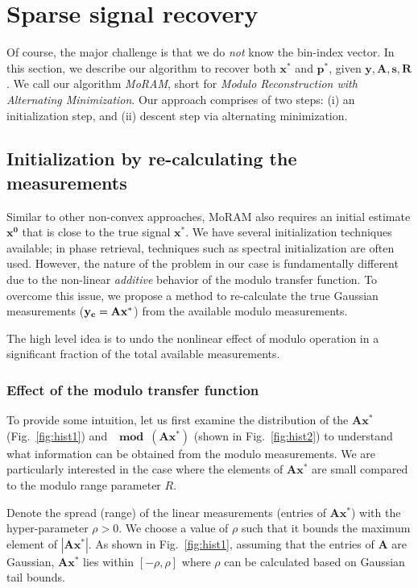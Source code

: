 \section{Sparse signal recovery}
\label{sec:algo}
Of course, the major challenge is that we do \emph{not} know the bin-index vector. In this section, we describe our algorithm to recover both $\mathbf{x^*}$ and $\mathbf{p^*}$, given $\mathbf{y, A, s, R}$.  We call our algorithm \emph{MoRAM}, short for \emph{Modulo Reconstruction with Alternating Minimization}. Our approach comprises of two steps: (i) an initialization step, and (ii) descent step via alternating minimization.

\subsection{Initialization by re-calculating the measurements}
\label{sec:init}

Similar to other non-convex approaches, MoRAM also requires an initial estimate $\mathbf{{x}^0}$ that is close to the true signal $\mathbf{{x}^*}$. We have several initialization techniques available; in phase retrieval, techniques such as spectral initialization are often used. However, the nature of the problem in our case is fundamentally different due to the non-linear \emph{additive} behavior of the modulo transfer function. To overcome this issue, we propose a method to re-calculate the true Gaussian measurements ($\mathbf{y_c}= \mathbf{Ax^*}$) from the available modulo measurements. 

The high level idea is to undo the nonlinear effect of modulo operation in a significant fraction of the total available measurements. %

\subsubsection{Effect of the modulo transfer function} 
\label{sec:modeff}
To provide some intuition, let us first examine the distribution of the $\mathbf{Ax^*}$(Fig.~\ref{fig:hist1}) and $\mathbf{\mod(\mathbf{Ax^*})}$ (shown in Fig.~\ref{fig:hist2}) to understand what information can be obtained from the modulo measurements. We are particularly interested in the case where the elements of $\mathbf{Ax^*}$ are small compared to the modulo range parameter $R$. 

Denote the spread (range) of the linear measurements (entries of $\mathbf{Ax^*}$) with the hyper-parameter $\rho > 0$. We choose a value of $\rho$ such that it bounds the maximum element of $|\mathbf{Ax^*}|$. As shown in Fig.~\ref{fig:hist1}, assuming that the entries of $\mathbf{A}$ are Gaussian, $\mathbf{Ax^*}$ lies within $[-\rho, \rho]$ where $\rho$ can be calculated based on Gaussian tail bounds.

